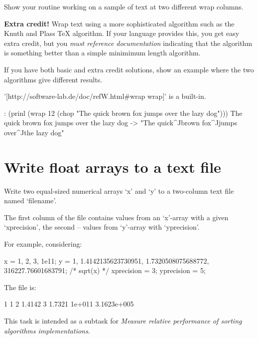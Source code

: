Show your routine working on a sample of text at two different wrap
columns.

\textbf{Extra credit!} Wrap text using a more sophisticated algorithm
such as the Knuth and Plass TeX algorithm. If your language provides
this, you get easy extra credit, but you \emph{must reference
documentation} indicating that the algorithm is something better than a
simple minimimum length algorithm.

If you have both basic and extra credit solutions, show an example where
the two algorithms give different results.

\begin{wideverbatim}

'[http://software-lab.de/doc/refW.html#wrap wrap]' is a built-in.

: (prinl (wrap 12 (chop "The quick brown fox jumps over the lazy dog")))
The quick
brown fox
jumps over
the lazy dog
-> "The quick^Jbrown fox^Jjumps over^Jthe lazy dog"

\end{wideverbatim}

\pagebreak{}
\section*{Write float arrays to a text file}

Write two equal-sized numerical arrays `x' and `y' to a two-column text
file named `filename'.

The first column of the file contains values from an `x'-array with a
given `xprecision', the second -- values from `y'-array with
`yprecision'.

For example, considering:

\begin{wideverbatim}
   x = {1, 2, 3, 1e11};
   y = {1, 1.4142135623730951, 1.7320508075688772, 316227.76601683791}; 
                                                          /* sqrt(x) */
   xprecision = 3;
   yprecision = 5;
\end{wideverbatim}

The file is:

\begin{wideverbatim}
   1    1
   2    1.4142
   3    1.7321
   1e+011   3.1623e+005
\end{wideverbatim}

This task is intended as a subtask for \emph{Measure relative
  performance of sorting algorithms implementations}.




